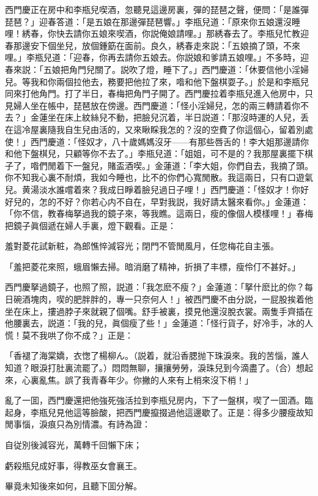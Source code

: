 西門慶正在房中和李瓶兒喫酒，忽聽見這邊房裏，彈的琵琶之聲，便問：「是誰彈琵琶？」迎春答道：「是五娘在那邊彈琵琶響。」李瓶兒道：「原來你五娘還沒睡哩！綉春，你快去請你五娘來喫酒，你説俺娘請哩。」那綉春去了。李瓶兒忙教迎春那邊安下個坐兒，放個鍾筯在面前。良久，綉春走來説：「五娘摘了頭，不來哩。」李瓶兒道：「迎春，你再去請你五娘去。你説娘和爹請五娘哩。」不多時，迎春來説：「五娘把角門兒關了。説吹了燈，睡下了。」西門慶道：「休要信他小淫婦兒。等我和你兩個拉他去，務要把他拉了來，喒和他下盤棋耍子。」於是和李瓶兒同來打他角門。打了半日，春梅把角門子開了。西門慶拉着李瓶兒進入他房中，只見婦人坐在帳中，琵琶放在傍邊。西門慶道：「怪小淫婦兒，怎的兩三轉請着你不去？」金蓮坐在床上紋絲兒不動，把臉兒沉着，半日説道：「那沒時運的人兒，丢在這冷屋裏隨我自生兒由活的，又來瞅睬我怎的？沒的空費了你這個心，留着別處使！」西門慶道：「怪奴才，八十歲媽媽沒牙——有那些唇舌的！李大姐那邊請你和他下盤棋兒，只顧等你不去了。」李瓶兒道：「姐姐，可不是的？我那屋裏擺下棋子了，喒們閒着下一盤兒，賭盃酒喫。」金蓮道：「李大姐，你們自去，我摘了頭。你不知我心裏不耐煩，我如今睡也，比不的你們心寬閒散。我這兩日，只有口遊氣兒。黄湯淡水誰嚐着來？我成日睜着臉兒過日子哩！」西門慶道：「怪奴才！你好好兒的，怎的不好？你若心内不自在，早對我説，我好請太醫來看你。」金蓮道：「你不信，教春梅拏過我的鏡子來，等我瞧。這兩日，瘦的像個人模樣哩！」春梅把鏡子眞個遞在婦人手裏，燈下觀看。正是：

\begin{myquote}
羞對菱花試新粧，為郎憔悴減容光；閉門不管閒風月，任您梅花自主張。

「羞把菱花來照，蛾眉懶去掃。暗消磨了精神，折損了丰標，瘦伶仃不甚好。」
\end{myquote}

西門慶拏過鏡子，也照了照，説道：「我怎麽不瘦？」金蓮道：「拏什麽比的你？每日碗酒塊肉，喫的肥胖胖的，專一只奈何人！」被西門慶不由分説，一屁股挨着他坐在床上，摟過脖子來就親了個嘴。舒手被裏，摸見他還沒脫衣裳。兩隻手齊插在他腰裏去，説道：「我的兒，眞個瘦了些！」金蓮道：「怪行貨子，好冷手，冰的人慌！莫不我哄了你不成？」正是：

\begin{myquote}
「香褪了海棠嬌，衣愡了楊柳ん。{\marktext\small\color{mydarkgray}（説着，就沿香腮抛下珠淚來。我的苦惱，誰人知道？眼淚打肚裏流罷了。）}悶悶無聊，攘攘勞勞，淚珠兒到今滴盡了。{\marktext\small（合）}想起來，心裏亂焦。誤了我青春年少。你撇的人來有上梢來沒下梢！」
\end{myquote}

亂了一囬，西門慶還把他強死強活拉到李瓶兒房内，下了一盤棋，喫了一囬酒。臨起身，李瓶兒見他這等臉酸，把西門慶攛掇過他這邊歇了。正是：得多少腰瘦故知閒事惱，淚痕只為別情濃。有詩為證：

\begin{myquote}
自従別後減容光，萬轉千回懶下床；

虧殺瓶兒成好事，得教巫女會襄王。
\end{myquote}

畢竟未知後來如何，且聽下囬分解。

